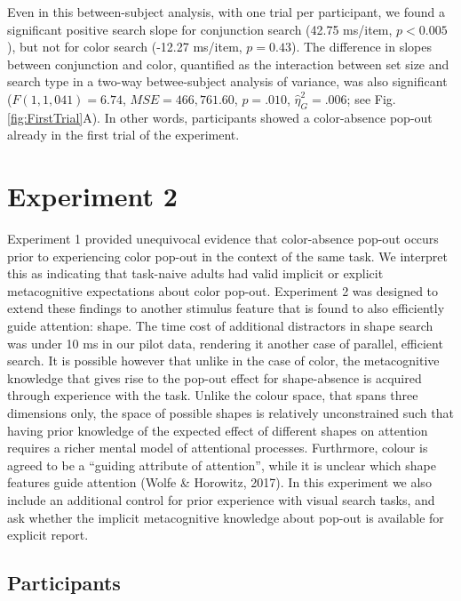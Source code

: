 \documentclass[
  english,
  man]{apa6}
\begin{document}
Even in this between-subject analysis, with one trial per participant, we found a significant positive search slope for conjunction search (42.75 ms/item, \(p<0.005\)), but not for color search (-12.27 ms/item, \(p=0.43\)). The difference in slopes between conjunction and color, quantified as the interaction between set size and search type in a two-way betwee-subject analysis of variance, was also significant (\(F(1, 1,041) = 6.74\), \(\mathit{MSE} = 466,761.60\), \(p = .010\), \(\hat{\eta}^2_G = .006\); see Fig. \ref{fig:FirstTrial}A). In other words, participants showed a color-absence pop-out already in the first trial of the experiment.

\hypertarget{experiment-2}{%
\section{Experiment 2}\label{experiment-2}}

Experiment 1 provided unequivocal evidence that color-absence pop-out occurs prior to experiencing color pop-out in the context of the same task. We interpret this as indicating that task-naive adults had valid implicit or explicit metacognitive expectations about color pop-out. Experiment 2 was designed to extend these findings to another stimulus feature that is found to also efficiently guide attention: shape. The time cost of additional distractors in shape search was under 10 ms in our pilot data, rendering it another case of parallel, efficient search. It is possible however that unlike in the case of color, the metacognitive knowledge that gives rise to the pop-out effect for shape-absence is acquired through experience with the task. Unlike the colour space, that spans three dimensions only, the space of possible shapes is relatively unconstrained such that having prior knowledge of the expected effect of different shapes on attention requires a richer mental model of attentional processes. Furthrmore, colour is agreed to be a \enquote{guiding attribute of attention}, while it is unclear which shape features guide attention (Wolfe \& Horowitz, 2017). In this experiment we also include an additional control for prior experience with visual search tasks, and ask whether the implicit metacognitive knowledge about pop-out is available for explicit report.

\hypertarget{participants-1}{%
\subsection{Participants}\label{participants-1}}
\end{document}
